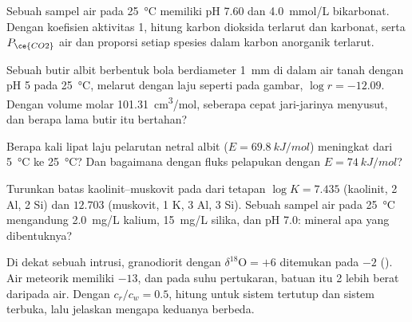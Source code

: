 \begin{exercise}[$\star\star$]\label{exo:b3:water-rock-interaction:6}
Sebuah sampel air pada \qty{25}{\celsius} memiliki pH 7.60 dan \qty{4.0}{mmol/L}
bikarbonat. Dengan koefisien aktivitas 1, hitung karbon dioksida terlarut dan karbonat,
serta $P_{\ce{CO2}}$ air dan proporsi setiap spesies dalam
karbon anorganik terlarut.
\end{exercise}

\begin{exercise}[$\star\star$]\label{exo:b3:water-rock-interaction:7}
Sebuah butir albit berbentuk bola berdiameter \qty{1}{mm} di dalam air tanah dengan pH 5 pada
\qty{25}{\celsius}, melarut dengan laju seperti pada gambar, $\log r = -12.09$.
Dengan volume molar \qty{101.31}{cm^3/mol}, seberapa cepat jari-jarinya
menyusut, dan berapa lama butir itu bertahan?
\end{exercise}

\begin{exercise}[$\star\star$]\label{exo:b3:water-rock-interaction:8}
Berapa kali lipat laju pelarutan netral albit ($E =
\qty{69.8}{kJ/mol}$) meningkat dari \qty{5}{\celsius} ke \qty{25}{\celsius}? Dan
bagaimana dengan fluks pelapukan dengan $E = \qty{74}{kJ/mol}$?
\end{exercise}

\begin{exercise}[$\star\star$]\label{exo:b3:water-rock-interaction:9}
Turunkan batas kaolinit--muskovit pada  dari
tetapan $\log K = 7.435$ (kaolinit, 2 Al, 2 Si) dan $12.703$ (muskovit, 1
K, 3 Al, 3 Si). Sebuah sampel air pada \qty{25}{\celsius} mengandung \qty{2.0}{mg/L}
kalium, \qty{15}{mg/L} silika, dan pH 7.0: mineral apa yang dibentuknya?
\end{exercise}

\begin{exercise}[$\star\star\star$]\label{exo:b3:water-rock-interaction:10}
Di dekat sebuah intrusi, granodiorit dengan $\delta^{18}\mathrm O = +6$ ditemukan
pada $-2$ (\unit{\permil}). Air meteorik memiliki $-13$, dan pada
suhu pertukaran, batuan itu \qty{2}{\permil} lebih berat daripada
air. Dengan $c_r/c_w = 0.5$, hitung  untuk sistem tertutup dan
sistem terbuka, lalu jelaskan mengapa keduanya berbeda.
\end{exercise}

